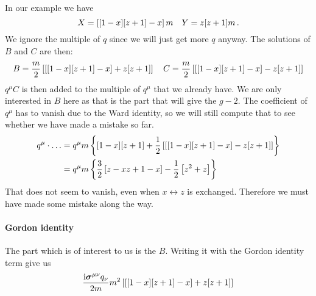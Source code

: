 \documentclass[11pt, english, fleqn, DIV=15, headinclude, BCOR=1cm]{scrartcl}
\begin{document}
In our example we have
\[
    X = \left[ [1 - x] [z + 1] - x \right] m
    \quad
    Y = z [z+1] m \,.
\]
We ignore the multiple of $q$ since we will just get more $q$ anyway. The
solutions of $B$ and $C$ are then:
\[
    B = \frac m2 \left[ \left[ [1 - x] [z + 1] - x \right] + z [z+1] \right]
    \quad
    C = \frac m2 \left[ \left[ [1 - x] [z + 1] - x \right] - z [z+1] \right]
\]
$q^\mu C$ is then added to the multiple of $q^\mu$ that we already have. We are
only interested in $B$ here as that is the part that will give the $g-2$. The
coefficient of $q^\mu$ has to vanish due to the Ward identity, so we will still
compute that to see whether we have made a mistake so far.
\begin{align*}
    q^\mu \cdot \ldots
    &= q^\mu m \left\{ 
        [1 - x] [z + 1] + \frac 12 \left[ \left[ [1 - x] [z + 1] - x \right] - z [z+1] \right]
     \right\} \\
    &= q^\mu m \left\{ 
        \frac 32 \left[ z - xz + 1 - x \right] - \frac 12 \left[ z^2 + z \right]
     \right\}
\end{align*}
That does not seem to vanish, even when $x \leftrightarrow z$ is exchanged.
Therefore we must have made some mistake along the way.

\paragraph{Gordon identity}

The part which is of interest to us is the $B$. Writing it with the Gordon
identity term give us
\[
    \frac{\iup \mat\sigma^{\mu\nu} q_\nu}{2m}
    m^2 \sbr{\sbr{[1 - x] [z + 1] - x} + z [z+1]}
\]
\end{document}
